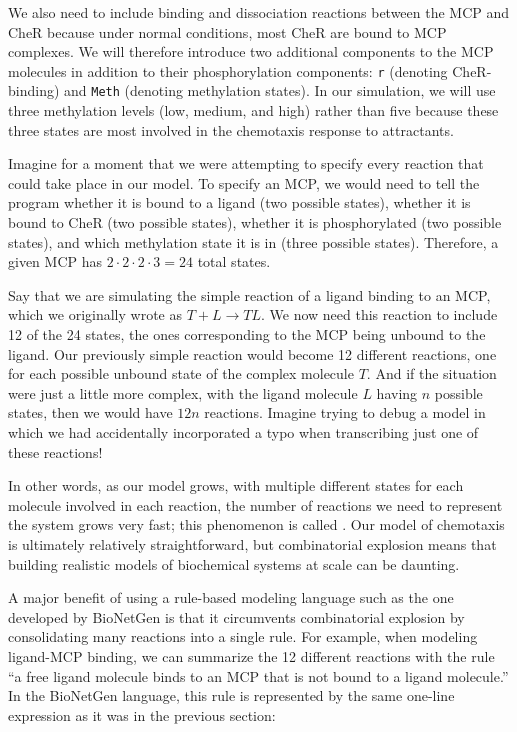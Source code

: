 We also need to include binding and dissociation reactions between the MCP and CheR because under normal conditions, most CheR are bound to MCP complexes.\citep{Lupas_1989} We will therefore introduce two additional components to the MCP molecules in addition to their phosphorylation components: \texttt{r} (denoting CheR-binding) and \texttt{Meth} (denoting methylation states). In our simulation, we will use three methylation levels (low, medium, and high) rather than five because these three states are most involved in the chemotaxis response to attractants.\citep{Boyd_1980}

Imagine for a moment that we were attempting to specify every reaction that could take place in our model. To specify an MCP, we would need to tell the program whether it is bound to a ligand (two possible states), whether it is bound to CheR (two possible states), whether it is phosphorylated (two possible states), and which methylation state it is in (three possible states). Therefore, a given MCP has $2 \cdot 2 \cdot 2 \cdot 3 = 24$ total states.

Say that we are simulating the simple reaction of a ligand binding to an MCP, which we originally wrote as $T + L \rightarrow TL$. We now need this reaction to include 12 of the 24 states, the ones corresponding to the MCP being unbound to the ligand. Our previously simple reaction would become 12 different reactions, one for each possible unbound state of the complex molecule $T$. And if the situation were just a little more complex, with the ligand molecule $L$ having $n$ possible states, then we would have $12n$ reactions. Imagine trying to debug a model in which we had accidentally incorporated a typo when transcribing just one of these reactions!

In other words, as our model grows, with multiple different states for each molecule involved in each reaction, the number of reactions we need to represent the system grows very fast; this phenomenon is called . Our model of chemotaxis is ultimately relatively straightforward, but combinatorial explosion means that building realistic models of biochemical systems at scale can be daunting.

A major benefit of using a rule-based modeling language such as the one developed by BioNetGen is that it circumvents combinatorial explosion by consolidating many reactions into a single rule. For example, when modeling ligand-MCP binding, we can summarize the 12 different reactions with the rule ``a free ligand molecule binds to an MCP that is not bound to a ligand molecule.'' In the BioNetGen language, this rule is represented by the same one-line expression as it was in the previous section:

